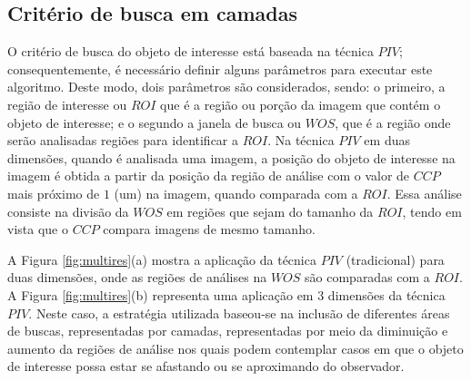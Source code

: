 \subsection{Critério de busca em camadas}

O critério de busca do objeto de interesse está baseada na técnica $PIV$; 
consequentemente, é necessário definir alguns parâmetros para executar  
este algoritmo. Deste modo, dois parâmetros são considerados, sendo: 
o primeiro, a região de interesse ou $ROI$ 
 que é a região ou porção da imagem que contém
o objeto de interesse; e o segundo a janela de busca ou $WOS$,
que é a região onde serão analisadas regiões para identificar a $ROI$. 
Na técnica $PIV$ em duas dimensões, quando é analisada uma imagem, 
a posição do objeto de interesse na imagem é obtida a partir 
da posição da região de análise 
com o valor de $CCP$ mais próximo de $1$ (um) na imagem,
quando comparada com a $ROI$. 
Essa análise consiste na divisão da $WOS$ em regiões que sejam do tamanho da $ROI$, tendo em vista que o $CCP$
compara imagens de mesmo tamanho.

A Figura \ref{fig:multires}(a) mostra a aplicação da técnica $PIV$ (tradicional)
para duas dimensões, onde as regiões de análises na $WOS$
são comparadas com a $ROI$. 
A Figura \ref{fig:multires}(b) representa uma aplicação em 3 dimensões da técnica $PIV$. 
Neste caso, a estratégia utilizada baseou-se na inclusão de diferentes áreas de buscas, 
representadas por camadas, representadas por meio da  diminuição e aumento da regiões de análise
nos quais podem contemplar casos em que o objeto de interesse possa estar se afastando ou se aproximando do observador.

